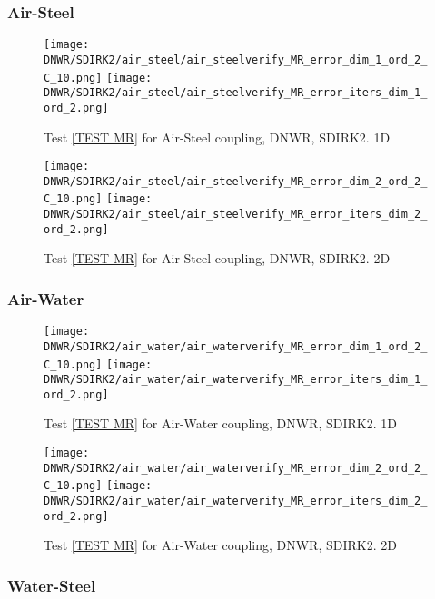 \documentclass[a4paper,10pt]{article}
\begin{document}
\FloatBarrier
\subsubsection{Air-Steel}\label{SEC DNWR SDIRK2 AIR STEEL}
% 

\begin{figure}[!ht]
\texttt{[image: DNWR/SDIRK2/air\_steel/air\_steelverify\_MR\_error\_dim\_1\_ord\_2\_C\_10.png]}
\texttt{[image: DNWR/SDIRK2/air\_steel/air\_steelverify\_MR\_error\_iters\_dim\_1\_ord\_2.png]}
\caption{Test \ref{TEST MR} for Air-Steel coupling, DNWR, SDIRK2. 1D}
\label{FIG DNWR SDIRK2 AIR STEEL 1D}
\end{figure}

\begin{figure}[!ht]
\texttt{[image: DNWR/SDIRK2/air\_steel/air\_steelverify\_MR\_error\_dim\_2\_ord\_2\_C\_10.png]}
\texttt{[image: DNWR/SDIRK2/air\_steel/air\_steelverify\_MR\_error\_iters\_dim\_2\_ord\_2.png]}
\caption{Test \ref{TEST MR} for Air-Steel coupling, DNWR, SDIRK2. 2D}
\label{FIG DNWR SDIRK2 AIR STEEL 2D}
\end{figure}

\FloatBarrier
\subsubsection{Air-Water}\label{SEC DNWR SDIRK2 AIR WATER}
% 

\begin{figure}[!ht]
\texttt{[image: DNWR/SDIRK2/air\_water/air\_waterverify\_MR\_error\_dim\_1\_ord\_2\_C\_10.png]}
\texttt{[image: DNWR/SDIRK2/air\_water/air\_waterverify\_MR\_error\_iters\_dim\_1\_ord\_2.png]}
\caption{Test \ref{TEST MR} for Air-Water coupling, DNWR, SDIRK2. 1D}
\label{FIG DNWR SDIRK2 AIR WATER 1D}
\end{figure}

\begin{figure}[!ht]
\texttt{[image: DNWR/SDIRK2/air\_water/air\_waterverify\_MR\_error\_dim\_2\_ord\_2\_C\_10.png]}
\texttt{[image: DNWR/SDIRK2/air\_water/air\_waterverify\_MR\_error\_iters\_dim\_2\_ord\_2.png]}
\caption{Test \ref{TEST MR} for Air-Water coupling, DNWR, SDIRK2. 2D}
\label{FIG DNWR SDIRK2 AIR WATER 2D}
\end{figure}

\FloatBarrier
\subsubsection{Water-Steel}\label{SEC DNWR SDIRK2 WATER STEEL}
% 
\end{document}
